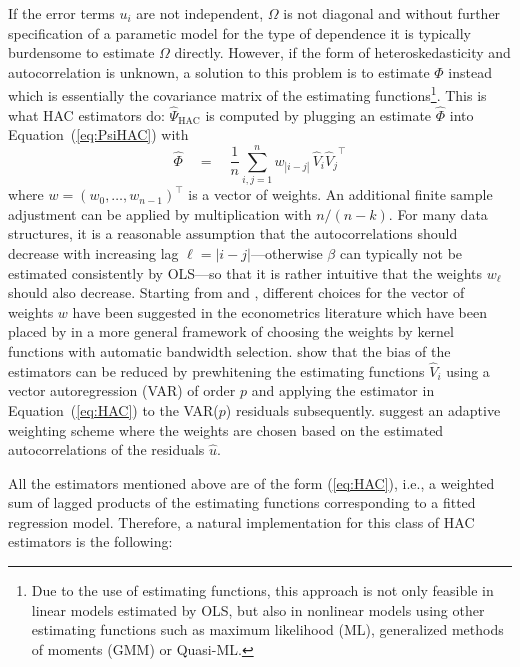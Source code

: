 \documentclass{Z}
\begin{document}
If the error terms $u_i$ are not independent, $\Omega$ is not diagonal and without
further specification of a parametic model for the type of dependence it is
typically burdensome to estimate $\Omega$ directly. However, if the form of 
heteroskedasticity and autocorrelation is unknown,
a solution to this problem is to estimate $\Phi$ instead which is 
essentially the covariance matrix of the estimating functions\footnote{Due to 
the use of estimating functions, this approach is not only feasible in linear 
models estimated by OLS, but also in nonlinear models using other estimating functions
such as maximum likelihood (ML), generalized methods of moments (GMM)
or Quasi-ML.}. This is what HAC estimators do: $\hat \Psi_{\mathrm{HAC}}$ is
computed by plugging an estimate $\hat \Phi$ into Equation~(\ref{eq:PsiHAC}) with
\begin{equation} \label{eq:HAC}
  \hat \Phi \quad = \quad \frac{1}{n}
  \sum_{i, j = 1}^n w_{|i-j|} \, {\hat V}_i {{\hat V}_j}^\top
\end{equation}
where $w = (w_0, \dots, w_{n-1})^\top$ is a vector of weights. An additional
finite sample adjustment can be applied by multiplication with $n/(n-k)$.
For many data structures, it is a reasonable assumption that the autocorrelations should decrease
with increasing lag $\ell = |i-j|$---otherwise $\beta$ can typically not be
estimated consistently by OLS---so that it is rather intuitive that the weights $w_\ell$ should
also decrease. Starting from \cite{hac:White+Domowitz:1984} and 
\cite{hac:Newey+West:1987}, different choices for the vector of weights $w$ have
been suggested in the econometrics literature which have been placed by
\cite{hac:Andrews:1991} in a more general framework of choosing the weights
by kernel functions with automatic bandwidth selection. \cite{hac:Andrews+Monahan:1992}
show that the bias of the estimators can be reduced by prewhitening the estimating
functions $\hat V_i$ using a vector autoregression (VAR) of order $p$
and applying the estimator in Equation~(\ref{eq:HAC}) to the VAR($p$) residuals
subsequently. \cite{hac:Lumley+Heagerty:1999} suggest an adaptive weighting scheme where the
weights are chosen based on the estimated autocorrelations of the residuals $\hat u$.

All the estimators mentioned above are of the form (\ref{eq:HAC}), i.e., a weighted 
sum of lagged products of the estimating functions corresponding to a fitted regression
model. Therefore, a natural implementation for this class of HAC estimators is the following:
\end{document}
